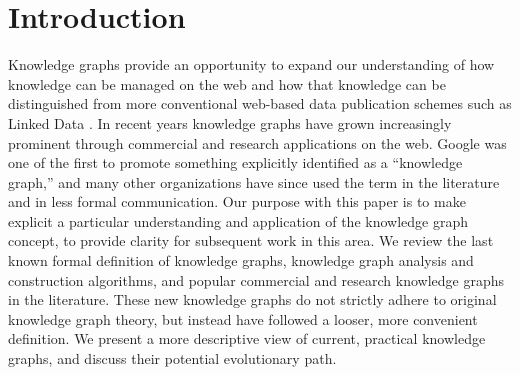 \section{Introduction}


Knowledge graphs provide an opportunity to expand our understanding of how knowledge can be managed on the web and how that knowledge can be distinguished from more conventional web-based data publication schemes such as Linked Data \cite{bizer2009linked}.
In recent years knowledge graphs have grown increasingly prominent through commercial and research applications on the web.
Google was one of the first to promote something explicitly identified as a ``knowledge graph,'' \cite{singhal2012introducing} and many other organizations have since used the term in the literature and in less formal communication.
Our purpose with this paper is to make explicit a particular understanding and application of the knowledge graph concept, to provide clarity for subsequent work in this area.
We review the last known formal definition of knowledge graphs, knowledge graph analysis and construction algorithms, and popular commercial and research knowledge graphs in the literature.
These new knowledge graphs do not strictly adhere to original knowledge graph theory, but instead have followed a looser, more convenient definition.
We present a more descriptive view of current, practical knowledge graphs, and discuss their potential evolutionary path.